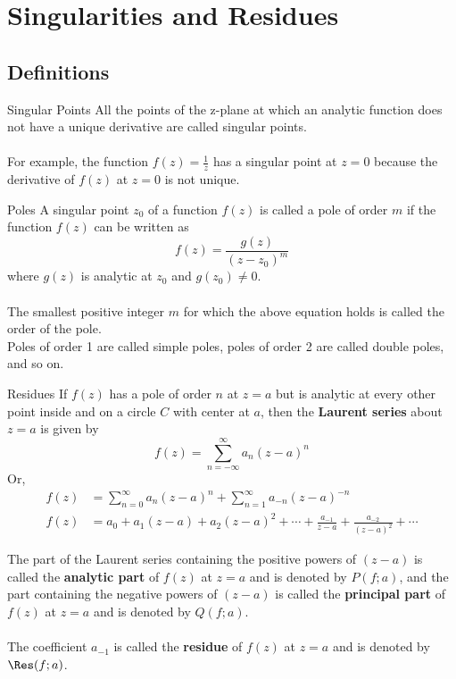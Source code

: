 
\section{Singularities and Residues}
\subsection{Definitions}
\begin{definition}{Singular Points}{}
    All the points of the z-plane at which an analytic function does not have a unique derivative are called singular points.  \\~\\
    
    For example, the function $f(z) = \frac{1}{z}$ has a singular point at $z = 0$ because the derivative of $f(z)$ at $z = 0$ is not unique.
\end{definition}

\begin{definition}{Poles}{}
    A singular point $z_0$ of a function $f(z)$ is called a pole of order $m$ if the function $f(z)$ can be written as
    \[ f(z) = \frac{g(z)}{(z - z_0)^m} \]
    where $g(z)$ is analytic at $z_0$ and $g(z_0) \neq 0$. \\~\\
    
    The smallest positive integer $m$ for which the above equation holds is called the order of the pole. \\
    Poles of order 1 are called simple poles, poles of order 2 are called double poles, and so on.
\end{definition}

\begin{definition}{Residues}{}
    If $f(z)$ has a pole of order $n$ at $z=a$ but is analytic at every other point inside and on a circle $C$ with center at $a$, then the \textbf{Laurent series} about $z=a$ is given by
    \begin{equation}
        f(z) = \sum_{n=-\infty}^{\infty} a_n (z-a)^n
    \end{equation} Or,
    \begin{align*}
        f(z) &= \sum_{n=0}^{\infty} a_n (z-a)^n + \sum_{n=1}^{\infty} a_{-n} (z-a)^{-n} \\
        f(z) &= a_0 + a_1(z-a) + a_2(z-a)^2 + \cdots + \frac{a_{-1}}{z-a} + \frac{a_{-2}}{(z-a)^2} + \cdots
    \end{align*}

    The part of the Laurent series containing the positive powers of $(z-a)$ is called the \textbf{analytic part} of $f(z)$ at $z=a$ and is denoted by $P(f;a)$, and the part containing the negative powers of $(z-a)$ is called the \textbf{principal part} of $f(z)$ at $z=a$ and is denoted by $Q(f;a)$.  \\~\\

    The coefficient $a_{-1}$ is called the \textbf{residue} of $f(z)$ at $z=a$ and is denoted by $\Res(f;a)$.
\end{definition}


